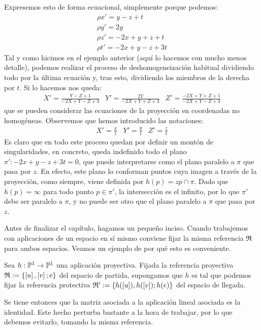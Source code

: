 \begin{exa}
	Expresemos esto de forma ecuacional, simplemente porque podemos:
	\[
	\begin{array}{l}
		\rho x'= y-z+t\\
		\rho y'= 2y\\
		\rho z'= -2x+y+z+t\\
		\rho t'= -2x+y-z+3t
	\end{array}
	\]
	Tal y como hicimos en el ejemplo anterior (aquí lo hacemos con mucho menos detalle), podemos realizar el proceso de deshomogeneización habitual dividiendo todo por la última ecuación y, tras esto, dividiendo los miembros de la derecha por $t$. Si lo hacemos nos queda:
	\[
	\begin{array}{ccc}
	X'=\frac{Y-Z+1}{-2X+Y-Z+3} &
	Y'=\frac{2Y}{-2X+Y+Z+3} &
	Z'=\frac{-2X+Y+Z+1}{-2X+Y-Z+3}
	\end{array}
	\]
	que se pueden considerar las ecuaciones de la proyección en coordenadas no homogéneas. Observemos que hemos introducido las notaciones:
	\[\begin{array}{ccc}
	X'=\frac{x}{t} & Y'=\frac{y}{t} & Z'=\frac{z}{t}
	\end{array}\]
	Es claro que en todo este proceso quedan por definir un montón de singularidades, en concreto, queda indefinido todo el plano $\pi':-2x+y-z+3t=0$, que puede interpretarse como el plano paralelo a $\pi$ que pasa por $z$. En efecto, este plano lo conforman puntos cuya imagen a través de la proyección, como siempre, viene definida por $h(p)=zp\cap \pi$. Dado que $h(p)=\infty$ para todo punto $p\in\pi'$, la intersección es el infinito, por lo que $\pi'$ debe ser paralelo a $\pi$, y no puede ser otro que el plano paralelo a $\pi$ que pasa por $z$.
\end{exa}
Antes de finalizar el capítulo, hagamos un pequeño inciso. Cuando trabajemos con aplicaciones de un espacio en sí mismo conviene fijar la misma referencia $\mathfrak{R}$ para ambos espacios. Veamos un ejemplo de por qué esto es conveniente.
\begin{exa}[Identidad]
	Sea $h:\mathbb{P}^1\to\mathbb{P}^1$ una aplicación proyectiva. Fijada la referencia proyectiva $\mathfrak{R}:=\{\left [ u \right ],\left [ v \right ];e\}$ del espacio de partida, supongamos que $h$ es tal que podemos fijar la referencia protectiva $\mathfrak{R}':=\{h(\left [ u \right ]),h(\left [ v \right ]);h(e)\}$ del espacio de llegada.
	
	Se tiene entonces que la matriz asociada a la aplicación lineal asociada es la identidad. Este hecho perturba bastante a la hora de trabajar, por lo que debemos evitarlo, tomando la misma referencia.
\end{exa}